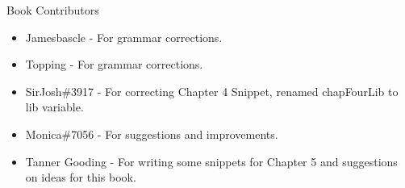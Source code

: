 \large Book Contributors \newline
\begin{itemize}
	\item Jamesbascle - For grammar corrections.
	\item Topping - For grammar corrections.
	\item SirJosh\#3917 - For correcting Chapter 4 Snippet, renamed chapFourLib to lib variable.
	\item Monica\#7056 - For suggestions and improvements.
	\item Tanner Gooding - For writing some snippets for Chapter 5 and suggestions on ideas for this book.
\end{itemize}

\newpage